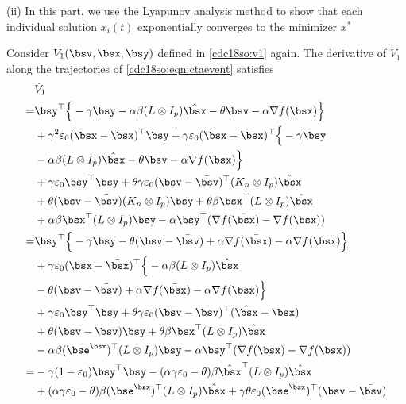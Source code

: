 \documentclass[letterpaper, 10 pt, conference]{ieeeconf}  %
\begin{document}
(ii) In this part, we use the Lyapunov analysis method to show that each individual solution $x_i(t)$ exponentially converges to the minimizer $x^*$


Consider $V_1(\bsv,\bsx,\bsy)$ defined in \eqref{cdc18so:v1} again.
The derivative of $V_1$ along the trajectories of \eqref{cdc18so:eqn:ctaevent} satisfies
\begin{align}\label{cdc18so:w2dotevent}
&\dot{V}_1\nonumber\\
=&\bsy^\top\Big\{- \gamma \bsy-\alpha\beta (L \otimes I_p)\hat{\bsx}-\theta  \bsv- \alpha \nabla f(\bsx)\Big\}\nonumber\\
&+\gamma^2\varepsilon_0 (\bsx-\bar{\bsx})^\top \bsy+\gamma\varepsilon_0(\bsx-\bar{\bsx})^\top \Big\{- \gamma \bsy\nonumber\\
&-\alpha\beta (L \otimes I_p)\hat{\bsx}- \theta \bsv- \alpha \nabla f(\bsx)\Big\}\nonumber\\
&+\gamma\varepsilon_0\bsy^\top \bsy+\theta\gamma\varepsilon_0 (\bsv-\bar{\bsv})^\top (K_n \otimes I_p)\hat{\bsx}\nonumber\\
&+\theta(\bsv-\bar{\bsv})(K_n\otimes I_p)\bsy+\theta\beta \bsx^\top(L\otimes I_p)\hat{\bsx}\nonumber\\
&+\alpha\beta \bsx^\top(L\otimes I_p)\bsy-\alpha \bsy^\top(\nabla f(\bar{\bsx})-\nabla f(\bsx))\nonumber\\
=&\bsy^\top\Big\{- \gamma \bsy-\theta (\bsv-\bar{\bsv})+\alpha \nabla f(\bar{\bsx})- \alpha \nabla f(\bsx)\Big\}\nonumber\\
&+\gamma\varepsilon_0(\bsx-\bar{\bsx})^\top \Big\{-\alpha\beta (L \otimes I_p)\hat{\bsx}\nonumber\\
&-\theta (\bsv-\bar{\bsv})+\alpha \nabla f(\bar{\bsx})- \alpha \nabla f(\bsx)\Big\}\nonumber\\
&+\gamma\varepsilon_0\bsy^\top \bsy+\theta\gamma\varepsilon_0 (\bsv-\bar{\bsv})^\top(\hat{\bsx}-\bar{\bsx})\nonumber\\
&+\theta(\bsv-\bar{\bsv})\bsy+\theta\beta \bsx^\top(L\otimes I_p)\hat{\bsx}\nonumber\\
&-\alpha\beta (\bse^\bsx)^\top(L\otimes I_p)\bsy-\alpha \bsy^\top(\nabla f(\bar{\bsx})-\nabla f(\bsx))\nonumber\\
=&-\gamma(1-\varepsilon_0)\bsy^\top \bsy-(\alpha\gamma\varepsilon_0-\theta)\beta\hat{\bsx}^\top (L \otimes I_p)\hat{\bsx}\nonumber\\
&+(\alpha\gamma\varepsilon_0-\theta)\beta(\bse^{\bsx})^\top (L \otimes I_p)\hat{\bsx}+\gamma \theta\varepsilon_0 (\bse^{\bsx})^\top(\bsv-\bar{\bsv})\nonumber\\

\end{align}
\end{document}
